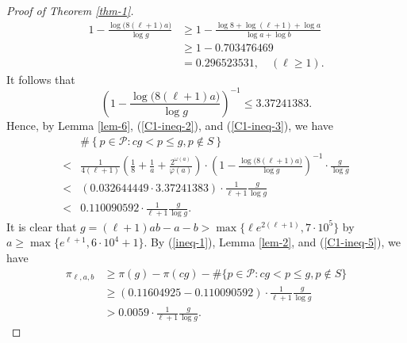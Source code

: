 \documentclass[12pt,a4paper,reqno]{amsart}
\numberwithin{equation}{section}
\def\cP{{\mathcal P}}
\theoremstyle{plain}
\theoremstyle{definition}
\begin{document}
\begin{proof}[Proof of Theorem \ref{thm-1}]
\begin{align*}
		1-\frac{\log \big( 8(\ell+1)a \big) }{\log g} 
		&\geq 1-\frac{\log 8+\log (\ell+1)+\log a}{\log a+\log b}\\
		&\geq 1-0.703476469\\
		&=0.296523531, \quad (\ell\geq 1). 
	\end{align*}
	It follows that
	\begin{equation}\label{C1-ineq-3}
		\left( 1-\frac{\log \big( 8(\ell+1)a \big) }{\log g}
		\right)^{-1}\leq 3.37241383.
	\end{equation}
	Hence, by Lemma \ref{lem-6}, (\ref{C1-ineq-2}), and (\ref{C1-ineq-3}), we have
	\begin{align}\label{C1-ineq-5}
		&\#\left\{p\in\cP:cg< p\leq g, p\notin S \right\} \nonumber\\
		< & \frac{1}{4(\ell+1)} \left( \frac{1}{8}+\frac{1}{a}+\frac{2^{\omega(a)}}{\varphi(a)} \right) \cdot \left( 1-\frac{\log \big(8(\ell+1)a \big)}{\log g}\right)^{-1}\cdot \frac{g}{\log g}\nonumber\\
		<& (0.032644449 \cdot 3.37241383)\cdot\frac{1}{\ell+1} \frac{g}{\log g}\nonumber\\
		<& 0.110090592 \cdot \frac{1}{\ell+1} \frac{g}{\log g}.
	\end{align}
	It is clear that $g=(\ell+1)ab-a-b>\max\{\ell e^{2(\ell+1)},7\cdot 10^{5}\}$ by $a\geq \max\{e^{\ell+1},6\cdot 10^{4}+1\}$.
	By (\ref{ineq-1}), Lemma \ref{lem-2}, and (\ref{C1-ineq-5}), we have
	\begin{align*}
		\pi_{\ell,a,b}&\geq \pi(g)-\pi(cg)-\#\{p\in\cP: cg< p\leq g, p\notin S\}\\
		&\geq  (0.11604925-0.110090592) \cdot \frac{1}{\ell+1}\frac{g}{\log g}\\
		&>0.0059 \cdot \frac{1}{\ell+1}\frac{g}{\log g}.
	\end{align*}
	

\end{proof}
\end{document}
